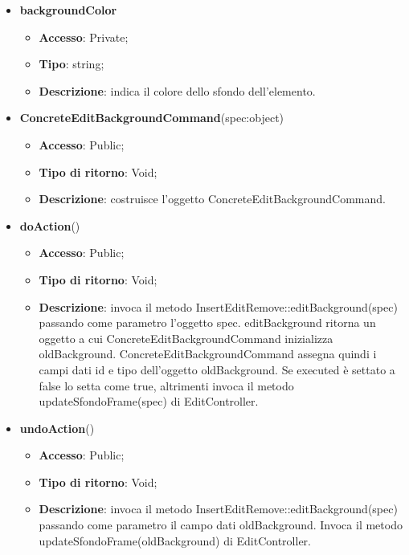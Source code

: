 {{{\begin{itemize}
\begin{itemize}
\begin{itemize}
\begin{itemize}
				\end{itemize}
				\item \textbf{backgroundColor}
				\begin{itemize}
					\item \textbf{Accesso}: Private;
					\item \textbf{Tipo}: string;
					\item \textbf{Descrizione}: indica il colore dello sfondo dell’elemento.
				\end{itemize}
			\end{itemize}
				\end{itemize}
				\end{itemize}
			\begin{itemize}
				\item \textbf{ConcreteEditBackgroundCommand}(spec:object)
				\begin{itemize}
					\item \textbf{Accesso}: Public;
					\item \textbf{Tipo di ritorno}: Void;
					\item \textbf{Descrizione}: costruisce l’oggetto ConcreteEditBackgroundCommand.
				\end{itemize}
				\item \textbf{doAction}()
				\begin{itemize}
					\item \textbf{Accesso}: Public;
					\item \textbf{Tipo di ritorno}: Void;
					\item \textbf{Descrizione}: invoca il metodo InsertEditRemove::editBackground(spec) passando come parametro l'oggetto spec. editBackground ritorna un oggetto a cui ConcreteEditBackgroundCommand inizializza oldBackground. ConcreteEditBackgroundCommand assegna quindi i campi dati id e tipo dell'oggetto oldBackground. Se executed è settato a false lo setta come true, altrimenti invoca il metodo updateSfondoFrame(spec) di EditController.
				\end{itemize}
				\item \textbf{undoAction}()
				\begin{itemize}
					\item \textbf{Accesso}: Public;
					\item \textbf{Tipo di ritorno}: Void;
					\item \textbf{Descrizione}: invoca il metodo InsertEditRemove::editBackground(spec) passando come parametro il campo dati oldBackground. Invoca il metodo updateSfondoFrame(oldBackground) di EditController.
				\end{itemize}
			\end{itemize}
			}

}}
